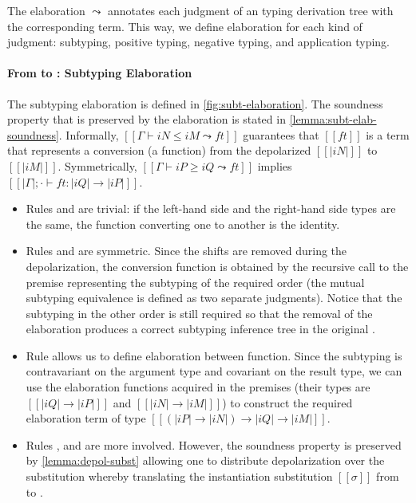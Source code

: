 \documentclass[acmsmall,natbib=false,review,anonymous]{acmart}
\begin{document}
The elaboration \fexists $\leadsto$ \systemf
annotates each judgment of an \fexists typing derivation tree
with the corresponding \systemf term. This way, 
we define elaboration for each kind of judgment:
subtyping, positive typing, negative typing, and application typing.

\paragraph{From \fexists to \systemf: Subtyping Elaboration}
The subtyping elaboration is defined in \cref{fig:subt-elaboration}.
The soundness property that is preserved by the elaboration is stated in
\cref{lemma:subt-elab-soundness}. Informally, $[[Γ ⊢ iN ≤ iM ⤳ ft]]$
guarantees that $[[ft]]$ is a \systemf term that represents 
a conversion (\ie a function) from the depolarized $[[|iN|]]$ to $[[|iM|]]$.
Symmetrically, $[[Γ ⊢ iP ≥ iQ ⤳ ft]]$ implies $[[|Γ| ; · ⊢ ft : |iQ| → |iP| ]]$.
\begin{itemize}
  \item Rules  and  
    are trivial: if the left-hand side and the right-hand side types are the 
    same, the function converting one to another is the identity.
  \item Rules  and 
    are symmetric. Since the shifts are removed during the depolarization,
    the conversion function is obtained by the recursive call to the 
    premise representing the subtyping of the required order
    (the mutual subtyping equivalence is defined as two separate judgments).
    Notice that the subtyping in the other order is still required
    so that the removal of the elaboration produces a correct
    subtyping inference tree in the original \fexists.
  \item Rule  allows us to
    define elaboration between function. Since the subtyping is 
    contravariant on the argument type and covariant on the result type,
    we can use the elaboration functions acquired in the premises
    (their types are $[[|iQ| → |iP|]]$ and $[[|iN| → |iM|]]$)
    to construct the required elaboration term of type 
    $[[(|iP| → |iN|) → |iQ| → |iM|]]$.
  \item Rules 
    , and 
    are more involved. However, the soundness property is preserved
    by \cref{lemma:depol-subst} allowing one to distribute
    depolarization over the substitution whereby
    translating the instantiation substitution $[[σ]]$ from \fexists to \systemf.
\end{itemize}
\end{document}
